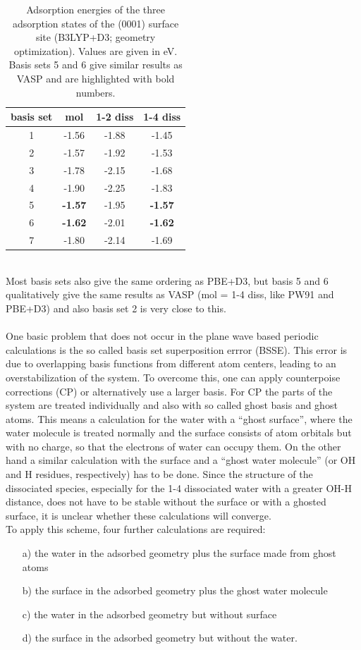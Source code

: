 \documentclass[11pt,DIV=13,BCOR=5mm,a4paper,headinclude]{scrbook}
\begin{document}
 \begin{table}[!h]
  \centering
   \caption{Adsorption energies of the three adsorption states of the (0001) surface site (B3LYP+D3; geometry optimization).
Values are given in eV.
Basis sets 5 and 6 give similar results as VASP and are highlighted with bold numbers.}
  \begin{tabular}{c|ccc}
  \toprule
  basis set & mol & 1-2 diss & 1-4 diss \\\midrule
  1 &-1.56 &-1.88 &-1.45 \\
  2 &-1.57 &-1.92 &-1.53 \\
  3 &-1.78 &-2.15 &-1.68 \\
  4 &-1.90 &-2.25 &-1.83 \\
  5 &\textbf{-1.57} &-1.95 &\textbf{-1.57} \\
  6 &\textbf{-1.62} &-2.01 &\textbf{-1.62} \\
  7 &-1.80 &-2.14 &-1.69 \\\bottomrule
  \end{tabular}
  \label{tab:basisset-results-B3LYP+D3}
\end{table}
\\
Most basis sets also give the same ordering as PBE+D3, but basis 5 and 6 qualitatively give the same results as VASP (mol = 1-4 diss, like PW91 and PBE+D3) and also basis set 2 is very close to this.
\\
\\
One basic problem that does not occur in the plane wave based periodic calculations is the so called basis set superposition errror (BSSE).
This error is due to overlapping basis functions from different atom centers, leading to an overstabilization of the system.
To overcome this, one can apply counterpoise corrections (CP) or alternatively use a larger basis.
For CP the parts of the system are treated individually and also with so called ghost basis and ghost atoms.
This means a calculation for the water with a ``ghost surface'', where the water molecule is treated normally and the surface consists of atom orbitals but with no charge, so that the electrons of water can occupy them.
On the other hand a similar calculation with the surface and a ``ghost water molecule'' (or OH and H residues, respectively) has to be done.
Since the structure of the dissociated species, especially for the 1-4 dissociated water with a greater OH-H distance, does not have to be stable without the surface or with a ghosted surface, it is unclear whether these calculations will converge.
\\
To apply this scheme, four further calculations are required:
\begin{itemize}
 \item[a)] the water in the adsorbed geometry plus the surface made from ghost atoms
 \item[b)] the surface in the adsorbed geometry plus the ghost water molecule
 \item[c)] the water in the adsorbed geometry but without surface
 \item[d)] the surface in the adsorbed geometry but without the water.
\end{itemize}
\end{document}
